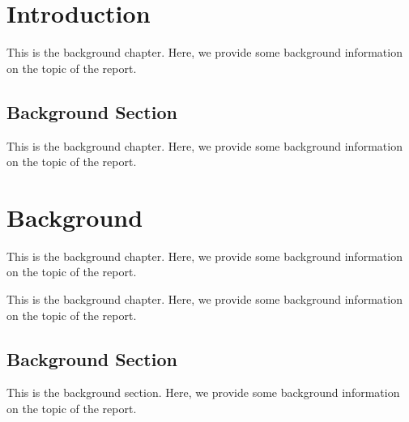 \documentclass{report}
\begin{document}

\chapter{Introduction}
This is the background chapter. Here, we provide some background information on
the topic of the report.
\section{Background Section}

This is the background chapter. Here, we provide some background information on
the topic of the report.
\chapter{Background}
This is the background chapter. Here, we provide some background information on
the topic of the report.

This is the background chapter. Here, we provide some background information on
the topic of the report.

\section{Background Section}
This is the background section. Here, we provide some background information on
the topic of the report.
\end{document}
